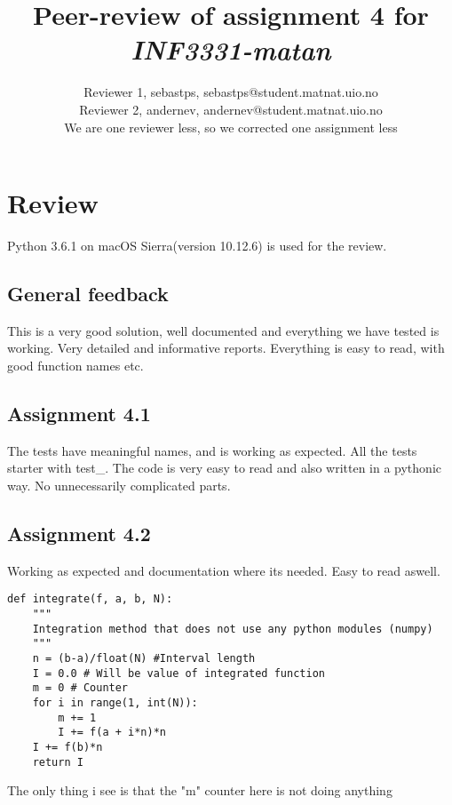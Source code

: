 \documentclass[a4paper]{article}
\title{Peer-review of assignment 4 for \textit{INF3331-matan}}
\author{Reviewer 1, sebastps, {sebastps@student.matnat.uio.no} \\
 		Reviewer 2, andernev, {andernev@student.matnat.uio.no} \\
        We are one reviewer less, so we corrected one assignment less}
\begin{document}
\maketitle

\section{Review \emph{}}\label{sec:review}

Python 3.6.1 on macOS Sierra(version 10.12.6) is used for the review.

\subsection*{General feedback}

This is a very good solution, well documented and everything we have tested is working. Very detailed and informative reports. Everything is easy to read, with good function names etc.

\subsection*{Assignment 4.1}

The tests have meaningful names, and is working as expected.
All the tests starter with test\_.
The code is very easy to read and also written in a pythonic way. No unnecessarily complicated parts.

\subsection*{Assignment 4.2} \label{sec:assignment5.2}

Working as expected and documentation where its needed.
Easy to read aswell.

\begin{verbatim}
def integrate(f, a, b, N):
    """
    Integration method that does not use any python modules (numpy)
    """
    n = (b-a)/float(N) #Interval length
    I = 0.0 # Will be value of integrated function
    m = 0 # Counter
    for i in range(1, int(N)):
        m += 1
        I += f(a + i*n)*n
    I += f(b)*n
    return I
\end{verbatim}

The only thing i see is that the "m" counter here is not doing anything
\end{document}
